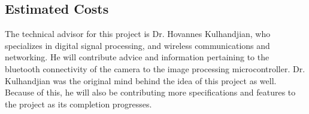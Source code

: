 \documentclass{IEEEtran}					%
\begin{document}
	\subsection{Estimated Costs}
	\begin{table} [h!]	
		\centering
		\caption{Estimated costs of components for project}
		\label{table:1}
					
	\end{table}		
\cite{test}
	The technical advisor for this project is Dr. Hovannes Kulhandjian, who specializes in digital signal processing, and wireless communications and networking.	He will contribute advice and information pertaining to the bluetooth connectivity of the camera to the image processing microcontroller. Dr. Kulhandjian was the original mind behind the idea of this project as well. Because of this, he will also be contributing more specifications and features to the project as its completion progresses. 			
	
		

		
\end{document}
